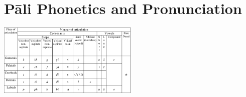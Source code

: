 \section{Pāli Phonetics and Pronunciation}
\label{phonetics}

\includegraphics[width=0.5\textwidth]{./assets/photos/300dpi/pali-table.png}





